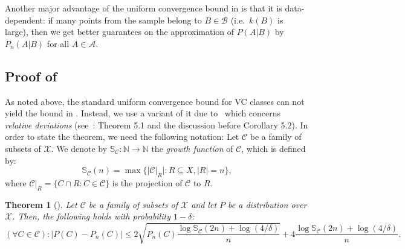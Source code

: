 \documentclass{article}
\def\X{{\mathcal X}}
\newcommand{\cA}{\mathcal{A}}
\newcommand{\cB}{\mathcal{B}}
\newcommand{\cC}{\mathcal{C}}
\newtheorem{theorem}{Theorem}
\begin{document}
Another major advantage of the uniform convergence bound in  is that it is data-dependent: 
if many points from the sample belong to $B\in \cB$ (i.e.\ $k(B)$ is large), 
then we get better guarantees on the approximation of $P(A\vert B)$ by $P_n(A\vert B)$ for all $A\in\cA$.



\subsection{Proof of }

As noted above,
the standard uniform convergence bound for VC classes
can not yield the bound in .
Instead, we use a variant of it due to~\cite{BBL05} which concerns {\it relative deviations}
(see~\cite{BBL05}: Theorem 5.1 and the discussion before Corollary 5.2).
In order to state the theorem, we need the following notation:
Let $\cC$ be a family of subsets of $\X$. We denote by $\mathbb{S}_\cC:\mathbb{N}\to\mathbb{N}$ the {\it growth function} of $\cC$, which is defined by:
\[
\mathbb{S}_\cC(n) = \max\{\lvert \cC|_R\rvert : R\subseteq X, \lvert R\rvert=n\},
\]
where $\cC|_R=\{C\cap R : C\in\cC\}$ is the projection of $\cC$ to $R$.
\begin{theorem}[\cite{BBL05}]\label{thm:ucrel}
Let $\cC$ be a family of subsets of $\X$  and let $P$
be a distribution over $\X$. Then, the following holds with probability $1-\delta$:
\[
(\forall C\in \cC): \lvert P(C)- P_n(C) \rvert \leq  2\sqrt{P_n(C)\frac{\log\mathbb{S}_\cC(2n) + \log(4/\delta)}{n}} + 4\frac{\log\mathbb{S}_\cC(2n) + \log(4/\delta)}{n}. 
\]
\end{theorem}
\end{document}
